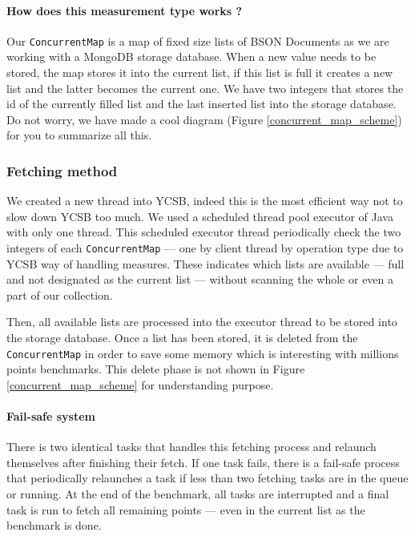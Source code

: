 \documentclass[a4paper,11pt]{report}
\begin{document}
\paragraph{How does this measurement type works ?}  Our \texttt{ConcurrentMap} is a map of fixed size lists of BSON Documents as we are working with a MongoDB storage database. When a new value needs to be stored, the map stores it into the current list, if this list is full it creates a new list and the latter becomes the current one. We have two integers that stores the id of the currently filled list and the last inserted list into the storage database. Do not worry, we have made a cool diagram (Figure \ref{concurrent_map_scheme}) for you to summarize all this.

\subsubsection{Fetching method}

We created a new thread into YCSB, indeed this is the most efficient way not to slow down YCSB too much. We used a scheduled thread pool executor of Java with only one thread. This scheduled executor thread periodically check the two integers of each \texttt{ConcurrentMap} --- one by client thread by operation type due to YCSB way of handling measures. These indicates which lists are available --- full and not designated as the current list --- without scanning the whole or even a part of our collection. 

Then, all available lists are processed into the executor thread to be stored into the storage database. Once a list has been stored, it is deleted from the \texttt{ConcurrentMap} in order to save some memory which is interesting with millions points benchmarks. This delete phase is not shown in Figure \ref{concurrent_map_scheme} for understanding purpose.


\paragraph{Fail-safe system}

There is two identical tasks that handles this fetching process and relaunch themselves after finishing their fetch. If one task fails, there is a fail-safe process that periodically relaunches a task if less than two fetching tasks are in the queue or running. At the end of the benchmark, all tasks are interrupted and a final task is run to fetch all remaining points --- even in the current list as the benchmark is done.
\end{document}
